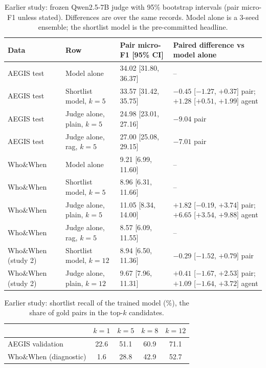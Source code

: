 \begin{table}[t]
\caption{Earlier study: frozen Qwen2.5-7B judge with 95\% bootstrap intervals (pair micro-F1 unless stated). Differences are over the same records. Model alone is a 3-seed ensemble; the shortlist model is the pre-committed headline.}
\label{tab:judge}
\centering\footnotesize\setlength{\tabcolsep}{3pt}
\begin{tabular}{@{}llll@{}}
\toprule
Data & Row & Pair micro-F1 [95\% CI] & Paired difference vs model alone \\
\midrule
AEGIS test & Model alone & 34.02 [31.80, 36.37] & -- \\
AEGIS test & Shortlist model, $k{=}5$ & 33.57 [31.42, 35.75] & $-0.45$ [$-1.27$, $+0.37$] pair; $+1.28$ [$+0.51$, $+1.99$] agent \\
AEGIS test & Judge alone, plain, $k{=}5$ & 24.98 [23.01, 27.16] & $-9.04$ pair \\
AEGIS test & Judge alone, rag, $k{=}5$ & 27.00 [25.08, 29.15] & $-7.01$ pair \\
Who\&When & Model alone & 9.21 [6.99, 11.60] & -- \\
Who\&When & Shortlist model, $k{=}5$ & 8.96 [6.31, 11.66] & -- \\
Who\&When & Judge alone, plain, $k{=}5$ & 11.05 [8.34, 14.00] & $+1.82$ [$-0.19$, $+3.74$] pair; $+6.65$ [$+3.54$, $+9.88$] agent \\
Who\&When & Judge alone, rag, $k{=}5$ & 8.57 [6.09, 11.55] & -- \\
Who\&When (study 2) & Shortlist model, $k{=}12$ & 8.94 [6.50, 11.36] & $-0.29$ [$-1.52$, $+0.79$] pair \\
Who\&When (study 2) & Judge alone, plain, $k{=}12$ & 9.67 [7.96, 11.31] & $+0.41$ [$-1.67$, $+2.53$] pair; $+1.09$ [$-1.64$, $+3.72$] agent \\
\bottomrule
\end{tabular}
\end{table}

\begin{table}[t]
\caption{Earlier study: shortlist recall of the trained model (\%), the share of gold pairs in the top-$k$ candidates.}
\label{tab:recall}
\centering\footnotesize\setlength{\tabcolsep}{3pt}
\begin{tabular}{@{}lcccc@{}}
\toprule
 & $k{=}1$ & $k{=}5$ & $k{=}8$ & $k{=}12$ \\
\midrule
AEGIS validation & 22.6 & 51.1 & 60.9 & 71.1 \\
Who\&When (diagnostic) & 1.6 & 28.8 & 42.9 & 52.7 \\
\bottomrule
\end{tabular}
\end{table}

